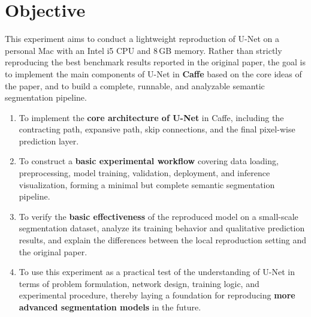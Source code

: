 \documentclass[11pt]{article}
\title{\vspace{-1.5em}\reporttitle}
\author{
    \authorname \\
    \labname \\
    \texttt{2024151470021@stu.scu.edu.cn}}
\date{\reportdate}
\begin{document}
\maketitle
\vspace{-1.5em}

\begin{abstract}
This report presents a lightweight reproduction study of U-Net for biomedical semantic segmentation under constrained computational resources. The goal is not to exactly match the original benchmark numbers, but to faithfully reconstruct the core architectural design and the basic training pipeline in Caffe, including data loading, preprocessing, model implementation, optimization, validation, deployment, and inference. The final version of the experiment adopts a weighted pixel-wise training objective inspired by the original U-Net paper and evaluates the reproduced model using a simplified local validation protocol. The final weighted model achieved a mean IoU of 0.252561 and a mean pixel error of 0.054223 on the seven-sample validation split, demonstrating that a Caffe-based U-Net can achieve meaningful biomedical segmentation behavior even in a CPU-only setting.
\end{abstract}

\section{Objective}

This experiment aims to conduct a lightweight reproduction of U-Net on a personal Mac with an Intel i5 CPU and 8\,GB memory. Rather than strictly reproducing the best benchmark results reported in the original paper, the goal is to implement the main components of U-Net in \textbf{Caffe} based on the core ideas of the paper, and to build a complete, runnable, and analyzable semantic segmentation pipeline.

\begin{enumerate}[leftmargin=1.5em]
    \item To implement the \textbf{core architecture of U-Net} in Caffe, including the contracting path, expansive path, skip connections, and the final pixel-wise prediction layer.
    \item To construct a \textbf{basic experimental workflow} covering data loading, preprocessing, model training, validation, deployment, and inference visualization, forming a minimal but complete semantic segmentation pipeline.
    \item To verify the \textbf{basic effectiveness} of the reproduced model on a small-scale segmentation dataset, analyze its training behavior and qualitative prediction results, and explain the differences between the local reproduction setting and the original paper.
    \item To use this experiment as a practical test of the understanding of U-Net in terms of problem formulation, network design, training logic, and experimental procedure, thereby laying a foundation for reproducing \textbf{more advanced segmentation models} in the future.
\end{enumerate}
\end{document}

